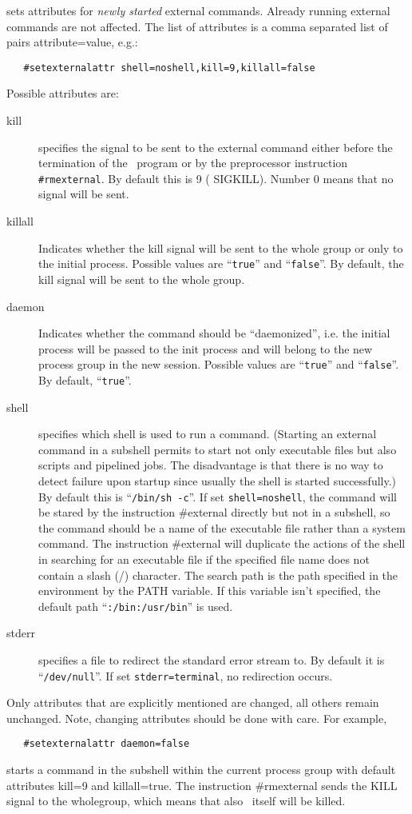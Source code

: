 \noindent sets attributes for {\em newly started} 
external commands. Already running external commands are not affected. The 
list of attributes is a comma separated list of pairs attribute=value, 
e.g.:
\begin{verbatim}
   #setexternalattr shell=noshell,kill=9,killall=false
\end{verbatim}
Possible attributes are:
\begin{description}
\item[kill]
specifies the signal to be sent to the external command 
either before the termination of the \FORM\ program or by the preprocessor 
instruction \verb|#rmexternal|. By default this is 9 (
SIGKILL). Number 0 means that no signal will be sent.
\item[killall] Indicates whether the kill signal will be sent to the whole 
group or only to the initial process. Possible values are ``\verb|true|'' 
and ``\verb|false|''. By default, the kill signal will be sent to the
whole group.
\item[daemon]
Indicates whether the command should be ``daemonized'', i.e. 
the initial process will be passed to the init process and will belong
to the new process group in the new session.  
Possible values are ``\verb|true|'' and ``\verb|false|''. By default, 
``\verb|true|''.
\item[shell]
specifies which shell is used to run a
command. (Starting an external command in a subshell permits to
start not only executable files but also scripts and 
pipelined jobs. The disadvantage is that there is no 
way to detect failure upon startup since usually the shell is started 
successfully.) By default this is ``\verb|/bin/sh -c|''.  If set 
\verb|shell=noshell|, the command will be stared by the instruction 
\#external directly but not in a subshell, so the command 
should be a name of the executable file rather than a system command. The 
instruction \#external will duplicate the actions of the shell in searching 
for an executable file if the specified file name does not contain a slash 
(/) character.  The search path is the path specified in the environment by 
the PATH variable.  If this variable isn't specified, the 
default path ``\verb|:/bin:/usr/bin|''
is used.
\item[stderr]
specifies a file to redirect the standard error 
stream to. By default it is ``\verb|/dev/null|''. If set 
\verb|stderr=terminal|, no redirection occurs.
\end{description}
Only attributes that are explicitly mentioned are changed, all others remain 
unchanged. Note, changing attributes should be done with care. For example,
\begin{verbatim}
   #setexternalattr daemon=false
\end{verbatim}
starts a command in the subshell within the current process group with
default attributes kill=9 and killall=true.
The instruction \#rmexternal sends the
KILL signal to the wholegroup, which means that also 
\FORM\ itself will be killed.

